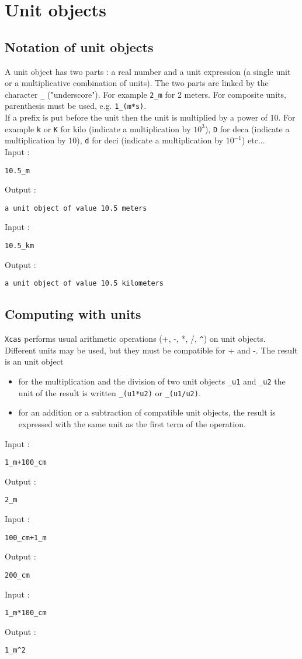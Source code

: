 \documentclass[a4paper,11pt]{book}
\begin{document}
\section{Unit objects}
\subsection{Notation of unit objects}
A unit object has two parts : a real number and a unit expression (a single 
unit or a multiplicative combination of units). The two parts are linked by the 
character {\tt \_} ("underscore"). For example {\tt 2\_m} for 2 meters.
For composite units, parenthesis must be used, e.g. {\tt 1\_(m*s)}.\\
If a prefix is put before the unit then the unit is multiplied by a power of
10. For example {\tt k} or {\tt K} for kilo (indicate a multiplication by 
$10^3$), {\tt D} for  deca (indicate a multiplication by $10$), {\tt d} for
deci (indicate a multiplication by $10^{-1}$) etc...\\ 
Input :
\begin{center}{\tt 10.5\_m}\end{center}
Output :
\begin{center}{\tt a unit object of value 10.5 meters}\end{center}
Input :
\begin{center}{\tt 10.5\_km}\end{center}
Output :
\begin{center}{\tt a unit object of value 10.5 kilometers}\end{center}

\subsection{Computing with units}
{\tt Xcas} performs usual arithmetic operations (+, -, *, /, \verb|^|) on
unit objects. Different units may be used, but they must be 
compatible for + and -. The result is an unit object
\begin{itemize}
\item for the 
multiplication and the division of two unit objects 
{\tt \_u1} and {\tt \_u2} the unit of the result is written 
{\tt \_(u1*u2)} or {\tt \_(u1/u2)}. 
\item  for an addition or a subtraction of compatible unit objects, 
the result is expressed with the same unit as the first term of the operation.
\end{itemize}
Input :
\begin{center}{\tt 1\_m+100\_cm}\end{center}
Output :
\begin{center}{\tt 2\_m}\end{center}
Input :
\begin{center}{\tt 100\_cm+1\_m}\end{center}
Output :
\begin{center}{\tt 200\_cm}\end{center}
Input :
\begin{center}{\tt 1\_m*100\_cm}\end{center}
Output :
\begin{center}{\tt 1\_m\verb|^|2}\end{center}
\end{document}
